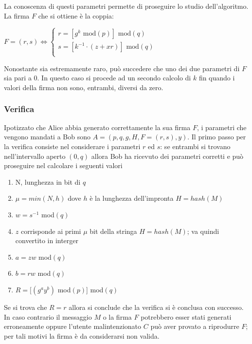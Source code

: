 \documentclass[a4paper,12pt]{tesiinfo}
\begin{document}
La conoscenza di questi parametri permette di proseguire lo studio dell'algoritmo.
La firma $F$ che si ottiene \`e la coppia:
\begin{center}
 $F =(r, s) \iff
 \begin{cases}
 r=[g^k \text{ mod}(p)] \text{ mod}(q)\\
 s=[k^{-1} \cdot (z+xr)] \text{ mod}(q)\\
\end{cases}$
\end{center}
Nonostante sia estremamente raro, pu\`o succedere che uno dei due parametri di $F$ sia pari a 0. In questo caso si procede ad un secondo calcolo di $k$ fin quando i valori della firma non sono, entrambi, diversi da zero.
\subsubsection{Verifica}
Ipotizzato che Alice abbia generato correttamente la sua firma $F$, i parametri che vengono mandati a Bob sono $A = (p, q, g, H, F=(r, s), y)$. Il primo passo per la verifica consiste nel considerare i parametri $r$ ed $s$: se entrambi si trovano nell'intervallo aperto $(0, q)$ allora Bob ha ricevuto dei parametri corretti e pu\`o proseguire nel calcolare i seguenti valori
\begin{enumerate}
 \item N, lunghezza in bit di $q$
 \item $\mu = min(N, h)$ dove $h$ \`e la lunghezza dell'impronta $H=hash(M)$
 \item $w = s^{-1}$ mod$(q)$
 \item $z$ corrisponde ai primi $\mu$ bit della stringa $H=hash(M)$; va quindi convertito in interger
 \item $a = zw $ mod$(q)$
 \item $b = rw $ mod$(q)$
 \item $R = [(g^ay^b) $ mod$(p)$] mod$(q)$
\end{enumerate}
Se si trova che $R = r$ allora si conclude che la verifica si \`e conclusa con successo. In caso contrario il messaggio $M$ o la firma $F$ potrebbero esser stati generati erroneamente oppure l'utente malintenzionato $C$ pu\`o aver provato a riprodurre $F$; per tali motivi la firma \`e da considerarsi non valida. 
%
%
%
%
%
%
%
%
%
%
%
%
%
\end{document}
